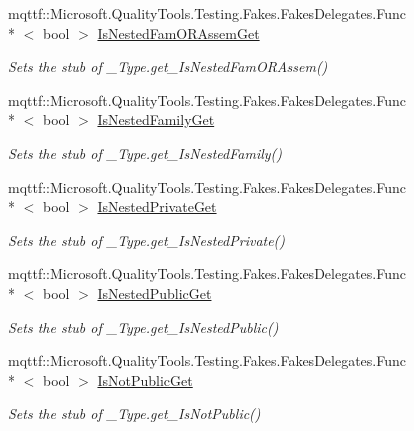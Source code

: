 \begin{DoxyCompactItemize}
mqttf\-::\-Microsoft.\-Quality\-Tools.\-Testing.\-Fakes.\-Fakes\-Delegates.\-Func\\*
$<$ bool $>$ \hyperlink{class_system_1_1_runtime_1_1_interop_services_1_1_fakes_1_1_stub___type_afd98811983291a41027a96eded0b9cc1}{Is\-Nested\-Fam\-O\-R\-Assem\-Get}
\begin{DoxyCompactList}\small\item\em Sets the stub of \-\_\-\-Type.\-get\-\_\-\-Is\-Nested\-Fam\-O\-R\-Assem()\end{DoxyCompactList}\item 
mqttf\-::\-Microsoft.\-Quality\-Tools.\-Testing.\-Fakes.\-Fakes\-Delegates.\-Func\\*
$<$ bool $>$ \hyperlink{class_system_1_1_runtime_1_1_interop_services_1_1_fakes_1_1_stub___type_a7c8484f38a04d407bd50e113b96d5428}{Is\-Nested\-Family\-Get}
\begin{DoxyCompactList}\small\item\em Sets the stub of \-\_\-\-Type.\-get\-\_\-\-Is\-Nested\-Family()\end{DoxyCompactList}\item 
mqttf\-::\-Microsoft.\-Quality\-Tools.\-Testing.\-Fakes.\-Fakes\-Delegates.\-Func\\*
$<$ bool $>$ \hyperlink{class_system_1_1_runtime_1_1_interop_services_1_1_fakes_1_1_stub___type_a93959d57a48384624e779406d24dc708}{Is\-Nested\-Private\-Get}
\begin{DoxyCompactList}\small\item\em Sets the stub of \-\_\-\-Type.\-get\-\_\-\-Is\-Nested\-Private()\end{DoxyCompactList}\item 
mqttf\-::\-Microsoft.\-Quality\-Tools.\-Testing.\-Fakes.\-Fakes\-Delegates.\-Func\\*
$<$ bool $>$ \hyperlink{class_system_1_1_runtime_1_1_interop_services_1_1_fakes_1_1_stub___type_abd74c19457e0bdaf876747faf328aade}{Is\-Nested\-Public\-Get}
\begin{DoxyCompactList}\small\item\em Sets the stub of \-\_\-\-Type.\-get\-\_\-\-Is\-Nested\-Public()\end{DoxyCompactList}\item 
mqttf\-::\-Microsoft.\-Quality\-Tools.\-Testing.\-Fakes.\-Fakes\-Delegates.\-Func\\*
$<$ bool $>$ \hyperlink{class_system_1_1_runtime_1_1_interop_services_1_1_fakes_1_1_stub___type_a29586df6fad59a8775bbab4bd01691d9}{Is\-Not\-Public\-Get}
\begin{DoxyCompactList}\small\item\em Sets the stub of \-\_\-\-Type.\-get\-\_\-\-Is\-Not\-Public()\end{DoxyCompactList}\item 

\end{DoxyCompactItemize}
